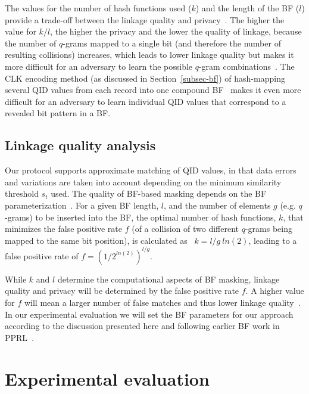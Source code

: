 \documentclass{sig-alternate}
\begin{document}
The values for the number of hash functions used ($k$) and the length
of the BF ($l$) 
provide a trade-off between the linkage quality and
privacy~\cite{Sch11}. The higher the value for $k/l$, the higher the
privacy and the lower the quality of linkage, because the number of
$q$-grams mapped to a single bit 
(and therefore the number of resulting collisions) increases, which leads to lower
linkage quality but makes it more difficult for an adversary to learn
the possible $q$-gram combinations~\cite{Kuz11}. 
The CLK encoding method
(as discussed in Section~\ref{subsec-bf}) of hash-mapping several QID
values from each record into one compound BF~\cite{Sch11,Vat12}
makes it even more difficult for an adversary to learn individual
QID values that correspond to a revealed 
bit pattern in a BF.

\subsection{Linkage quality analysis}
\label{subsec_quality_analsis}

Our protocol supports approximate matching of QID values, in that
data errors and variations are taken into account depending on
the minimum similarity threshold $s_t$ used.
The quality of BF-based masking depends on the
BF parameterization~\cite{Sch11,Vat14b}.
For a given BF length, $l$, and the number of elements $g$
(e.g. $q$-grams) to be
inserted into the BF, the optimal number of hash
functions, $k$, that minimizes the false positive rate $f$
(of a collision of two different $q$-grams being mapped to the
same bit position), is
calculated as~\cite{Mit05}
$k = l/g~ln(2)$,
leading to a false positive rate of
$f =  (1/2^{ln(2)})^{l/g}$.

While $k$ and $l$ determine the computational aspects of BF masking,
linkage quality and privacy will be determined by the false positive
rate $f$. A higher value for $f$ will mean a larger number of false
matches and thus lower linkage quality~\cite{Mit05,Sch11}. 
In our experimental evaluation we will set the BF
parameters for our approach according to the discussion presented here
and following earlier BF work in PPRL~\cite{Dur13,Sch11,Vat12,Vat14b}.


\section{Experimental evaluation}
\label{sec-experiment}
\end{document}
